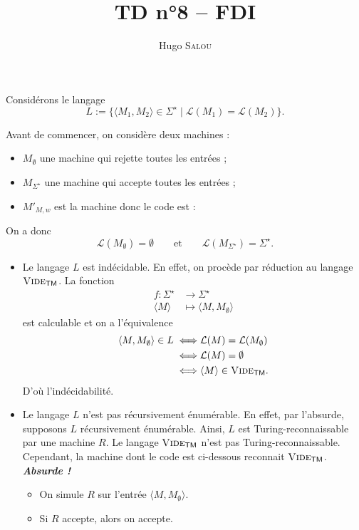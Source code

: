 \documentclass{../../notes}
\title{TD n°8 -- FDI}
\author{Hugo \scshape Salou}
\begin{document}
  Considérons le langage \[
    L := \{\langle M_1, M_2 \rangle \in \Sigma^\star \mid \mathcal{L}(M_1) = \mathcal{L}(M_2) \}
  .\]

  Avant de commencer, on considère deux machines :
  \begin{itemize}
    \item $M_\emptyset$ une machine qui rejette toutes les entrées ;
    \item $M_{\Sigma^\star}$ une machine qui accepte toutes les entrées ;
    \item $M'_{M,w}$ est la machine  donc le code est :
  \end{itemize}
  On a donc \[
    \mathcal{L}(M_\emptyset) = \emptyset \quad\quad \text{et}\quad\quad \mathcal{L}(M_{\Sigma^\star}) = \Sigma^\star
  .\]

  \begin{itemize}
    \item Le langage $L$ est indécidable.
      En effet, on procède par réduction au langage $\textsc{Vide}_\mathsf{TM}$.
      La fonction \begin{align*}
        f:\Sigma^\star &\longrightarrow \Sigma^\star \\
        \langle M \rangle &\longmapsto \langle M, M_{\emptyset} \rangle
      \end{align*}
      est calculable et on a l'équivalence
      \begin{align*}
        \langle M, M_\emptyset\rangle \in L \iff& \mathcal{L}(M) = \mathcal{L}(M_\emptyset)\\
        \iff& \mathcal{L}(M) = \emptyset\\
        \iff& \langle M \rangle \in \textsc{Vide}_\mathsf{TM}
      .\end{align*}
      D'où l'indécidabilité.
    \item Le langage $L$ n'est pas récursivement énumérable.
      En effet, par l'absurde, supposons $L$ récursivement énumérable.
      Ainsi, $L$ est Turing-reconnaissable par une machine $R$.
      Le langage $\textsc{Vide}_\mathsf{TM}$ n'est pas Turing-reconnaissable.
      Cependant, la machine dont le code est ci-dessous reconnait $\textsc{Vide}_\mathsf{TM}$.
      \textit{\textbf{Absurde !}}
      \begin{itemize}
        \item On simule $R$ sur l'entrée $\langle M, M_\emptyset \rangle$.
        \item Si $R$ accepte, alors on accepte.
      \end{itemize}
  \end{itemize}
\end{document}
